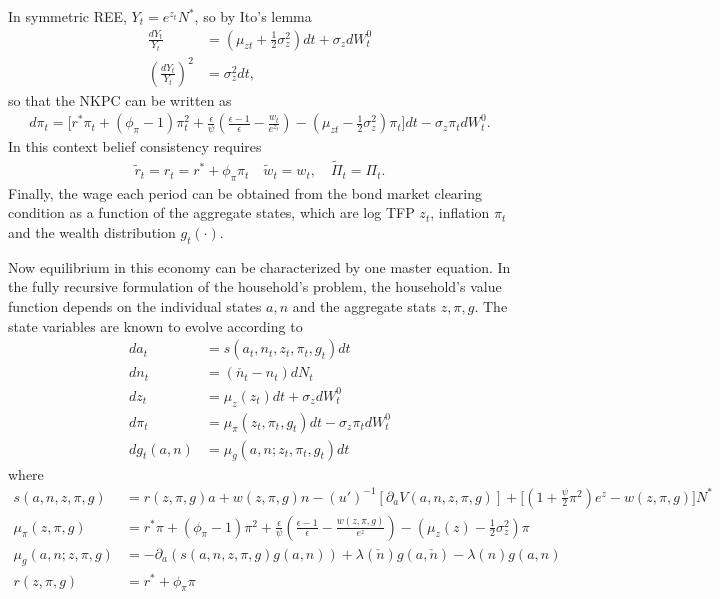 \documentclass[notitlepage,a4paper,11pt]{report}
\numberwithin{section}{chapter}
\numberwithin{subsection}{section}
\begin{document}
In symmetric REE, $Y_t = e^{z_t} N^*$, so by Ito's lemma 
\begin{align*}
\frac{dY_t}{Y_t} & = \left( \mu_{zt}  + \frac{1}{2} \sigma_z^2 \right) dt + \sigma_z dW_t^0 \\[10pt]
\left( \frac{dY_t}{Y_t}  \right)^2 & = \sigma_z^2 dt, 
\end{align*}
so that the NKPC can be written as 
\begin{align*}
d \pi_t = \Bigg[ r^* \pi_t + (\phi_{\pi} -1)\pi_t^2 +  \frac{\epsilon}{\psi} \left( \frac{\epsilon-1}{\epsilon} - \frac{w_t}{e^{z_t}} \right) - \left( \mu_{zt} - \frac{1}{2} \sigma_z^2 \right) \pi_t \Bigg] dt - \sigma_z \pi_t dW_t^0. 
\end{align*}
In this context belief consistency requires 
\begin{align*}
\tilde{r}_t = r_t = r^* + \phi_{\pi} \pi_t  \quad \tilde{w}_t = w_t, \quad \tilde{\Pi}_t = \Pi_t. 
\end{align*}
Finally, the wage each period can be obtained from the bond market clearing condition as a function of the aggregate states, which are log TFP $z_t$, inflation $\pi_t$ and the wealth distribution $g_t(\cdot)$. 

Now equilibrium in this economy can be characterized by one master equation. In the fully recursive formulation of the household's problem, the household's value function depends on the individual states $a,n$ and the aggregate stats $z, \pi, g$. The state variables are known to evolve according to 
\begin{align*}
d a_t & = s(a_t, n_t, z_t, \pi_t, g_t) dt \\[10pt]
d n_t & = \left( \check{n_t} - n_t \right) dN_t \\[10pt]
dz_t & = \mu_z(z_t) dt + \sigma_z dW_t^0 \\[10pt]
d \pi_t & = \mu_{\pi} \left( z_t, \pi_t, g_t \right) dt - \sigma_z \pi_t dW_t^0 \\[10pt]
d g_t(a,n) & = \mu_g ( a,n ; z_t, \pi_t, g_t) dt 
\end{align*}
where
\begin{align*}
s(a,n, z,\pi, g) & = r(z,\pi,g) a + w(z,\pi,g) n - (u')^{-1} \left[ \partial_a V(a,n,z, \pi,g) \right] + \Big[  \left( 1 +  \frac{\psi}{2} \pi^2 \right) e^z - w(z,\pi,g)    \Big]  N^* \\[10pt]
\mu_{\pi}( z,\pi, g) & = r^* \pi + (\phi_{\pi} - 1) \pi^2 + \frac{\epsilon}{\psi} \left( \frac{\epsilon-1}{\epsilon} - \frac{w(z,\pi,g) }{e^{z}} \right)  -  \left( \mu_z(z) - \frac{1}{2} \sigma_z^2 \right) \pi \\[10pt]
\mu_g ( a,n ; z, \pi, g)  & =  - \partial_a \left( s(a,n, z, \pi, g) g(a,n) \right) + \lambda(\check{n}) g(a,\check{n} ) - \lambda(n) g(a,n) \\[10pt]
r(z,\pi,g) & = r^* + \phi_{\pi} \pi 
\end{align*}
\end{document}
